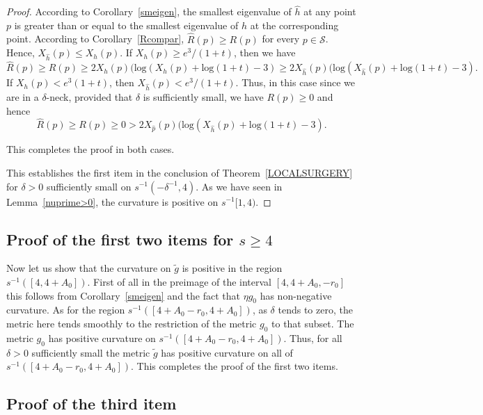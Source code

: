 \begin{proof}
According to Corollary~\ref{smeigen}, the smallest eigenvalue of $\hat
h$ at any point $p$ is greater than or equal to the smallest
eigenvalue of $h$ at the corresponding point. According to
Corollary~\ref{Rcompar}, $\hat R(p)\ge R(p)$ for every $p\in
{\mathcal S}$. Hence, $X_{\hat h}(p)\le X_h(p)$. If $X_h(p)\ge
e^3/(1+t)$, then we have
$$\hat R(p)\ge R(p)\ge 2X_h(p)(\mathrm{log}(X_h(p)+\mathrm{log}(1+t)-3)\ge 2X_{\hat h}(p)
(\mathrm{log}(X_{\hat h}(p)+\mathrm{log}(1+t)-3).$$
If $X_h(p)<e^3(1+t)$, then $X_{\hat h}(p)<e^3/(1+t)$. Thus, in this case
since we are in a $\delta$-neck, provided that $\delta$ is sufficiently small, we have
 $R(p)\ge 0$ and hence
$$\hat R(p)\ge R(p)\ge 0>2X_{\hat p}(p)(\mathrm{log}(X_{\hat h}(p)+\mathrm{log}(1+t)-3).$$

This completes the proof in both cases.


This establishes the first item in the conclusion of
Theorem~\ref{LOCALSURGERY} for $\delta>0$ sufficiently small on
$s^{-1}(-\delta^{-1},4)$. As we have seen in Lemma~\ref{nuprime>0},
the curvature is positive on $s^{-1}[1,4)$.
\end{proof}


\subsection{Proof of the first two items for $s\ge 4$}

Now let us show that the curvature on $\tilde g$ is positive in the region
$s^{-1}([4,4+A_0])$. First of all in the preimage of the
interval $[4,4+A_0,-r_0]$ this follows
from Corollary~\ref{smeigen} and the fact that $\eta g_0$ has non-negative
curvature. As for the region $s^{-1}([4+A_0-r_0,4+A_0])$, as $\delta$ tends to
zero, the metric here tends smoothly to the restriction of the metric $g_0$ to
that subset. The metric $g_0$ has positive curvature on
$s^{-1}([4+A_0-r_0,4+A_0])$. Thus, for all $\delta>0$ sufficiently small the
metric $\tilde g$ has positive curvature on all of $s^{-1}([4+A_0-r_0,4+A_0])$.
This completes the proof of the first two items.




\subsection{Proof of the third item}

